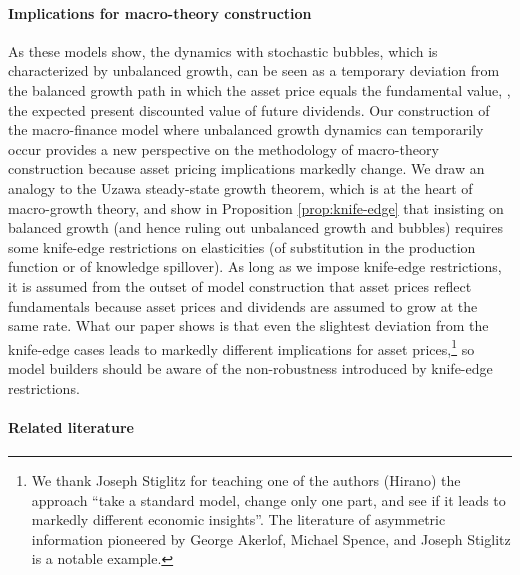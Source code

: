 \documentclass[a4paper,12pt]{article}
\numberwithin{equation}{section}
\theoremstyle{plain}
\begin{document}
\paragraph{Implications for macro-theory construction}
As these models show, the dynamics with stochastic bubbles, which is characterized by unbalanced growth, can be seen as a temporary deviation from the balanced growth path in which the asset price equals the fundamental value, \ie, the expected present discounted value of future dividends. Our construction of the macro-finance model where unbalanced growth dynamics can temporarily occur provides a new perspective on the methodology of macro-theory construction because asset pricing implications markedly change. We draw an analogy to the Uzawa steady-state growth theorem, which is at the heart of macro-growth theory, and show in Proposition \ref{prop:knife-edge} that insisting  on balanced growth (and hence ruling out unbalanced growth and bubbles) requires some knife-edge restrictions on elasticities (of substitution in the production function or of knowledge spillover). As long as we impose knife-edge restrictions, it is assumed from the outset of model construction that asset prices reflect fundamentals because asset prices and dividends are assumed to grow at the same rate. What our paper shows is that even the slightest deviation from the knife-edge cases leads to markedly different implications for asset prices,\footnote{We thank Joseph Stiglitz for teaching one of the authors (Hirano) the approach ``take a standard model, change only one part, and see if it leads to markedly different economic insights''. The literature of asymmetric information pioneered by George Akerlof, Michael Spence, and Joseph Stiglitz is a notable example.} so model builders should be aware of the non-robustness introduced by knife-edge restrictions.

\paragraph{Related literature}
\end{document}
